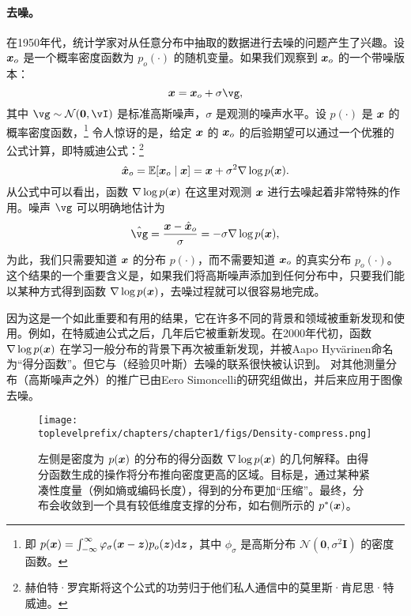 \documentclass[../../book-main_zh.tex]{subfiles}
\begin{document}
\paragraph{去噪。} 在1950年代，统计学家对从任意分布中抽取的数据进行去噪的问题产生了兴趣。设 $\bm{x}_o$ 是一个概率密度函数为 $p_o(\cdot)$ 的随机变量。如果我们观察到 $\bm{x}_o$ 的一个带噪版本：
\begin{equation}
    \x = \x_o + \sigma \vg, 
\end{equation}
其中 $\vg \sim \dNorm(\vzero, \vI)$ 是标准高斯噪声，$\sigma$ 是观测的噪声水平。设 $p(\cdot)$ 是 $\bm{x}$ 的概率密度函数，\footnote{即 $p(\bm{x}) = \int_{-\infty}^{\infty} \varphi_{\sigma}(\bm{x} - \bm{z})p_o(\bm{z}) \mathrm{d}\bm{z}$，其中 $\phi_{\sigma}$ 是高斯分布 $\mathcal{N}(\boldsymbol{0}, \sigma^2 \boldsymbol{I})$ 的密度函数。} 令人惊讶的是，给定 $\bm{x}$ 的 $\bm{x}_o$ 的后验期望可以通过一个优雅的公式计算，即特威迪公式\cite{Robbins1956AnEB}：\footnote{赫伯特·罗宾斯将这个公式的功劳归于他们私人通信中的莫里斯·肯尼思·特威迪。}
\begin{equation}
    \hat {\bm{x}}_o = \mathbb{E}[\bm{x}_o\mid \bm{x}] = \bm{x} + \sigma^2 \nabla \log p(\bm{x}).
\end{equation}
从公式中可以看出，函数 $\nabla \log p(\bm{x})$ 在这里对观测 $\bm{x}$ 进行去噪起着非常特殊的作用。噪声 $\vg$ 可以明确地估计为
\begin{equation}
    \hat{\vg} = \frac{\x - \hat \x_o}{\sigma} = -\sigma \nabla \log p(\x),
\end{equation}
为此，我们只需要知道 $\bm{x}$ 的分布 $p(\cdot)$，而不需要知道 $\bm{x}_o$ 的真实分布 $p_o(\cdot)$。这个结果的一个重要含义是，如果我们将高斯噪声添加到任何分布中，只要我们能以某种方式得到函数 $\nabla \log p(\bm{x})$，去噪过程就可以很容易地完成。

因为这是一个如此重要和有用的结果，它在许多不同的背景和领域被重新发现和使用。例如，在特威迪公式\cite{Robbins1956AnEB}之后，几年后它被\cite{Miyasawa61}重新发现。在2000年代初，函数 $\nabla \log p(\bm{x})$ 在学习一般分布的背景下再次被重新发现，并被Aapo Hyv\"{a}rinen命名为“得分函数”\cite{hyvarinen05a}。但它与（经验贝叶斯）去噪的联系很快被\cite{Vincent2011}认识到。
对其他测量分布（高斯噪声之外）的推广已由Eero Simoncelli的研究组\cite{Raphan10}做出，并后来应用于图像去噪\cite{Kadkhodaie21a,ho2020denoising}。

\begin{figure}
    \centering
    \texttt{[image: \\toplevelprefix/chapters/chapter1/figs/Density-compress.png]}
    \caption{左侧是密度为 $p(\bm{x})$ 的分布的得分函数 $\nabla \log p(\bm{x})$ 的几何解释。由得分函数生成的操作将分布推向密度更高的区域。目标是，通过某种紧凑性度量（例如熵或编码长度），得到的分布更加“压缩”。最终，分布会收敛到一个具有较低维度支撑的分布，如右侧所示的 $p^*(\bm{x})$。}
    \label{fig:score-function}
\end{figure}
\end{document}
